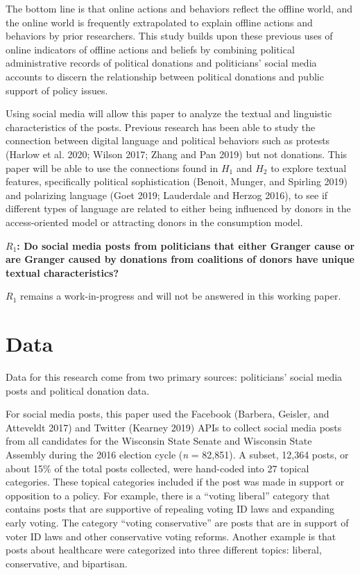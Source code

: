 \documentclass[12pt,]{article}
\begin{document}
The bottom line is that online actions and behaviors reflect the offline
world, and the online world is frequently extrapolated to explain
offline actions and behaviors by prior researchers. This study builds
upon these previous uses of online indicators of offline actions and
beliefs by combining political administrative records of political
donations and politicians' social media accounts to discern the
relationship between political donations and public support of policy
issues.

Using social media will allow this paper to analyze the textual and
linguistic characteristics of the posts. Previous research has been able
to study the connection between digital language and political behaviors
such as protests (Harlow et al. 2020; Wilson 2017; Zhang and Pan 2019)
but not donations. This paper will be able to use the connections found
in \(H_{1}\) and \(H_{2}\) to explore textual features, specifically
political sophistication (Benoit, Munger, and Spirling 2019) and
polarizing language (Goet 2019; Lauderdale and Herzog 2016), to see if
different types of language are related to either being influenced by
donors in the access-oriented model or attracting donors in the
consumption model.

\textbf{\(R_{1}\): Do social media posts from politicians that either
Granger cause or are Granger caused by donations from coalitions of
donors have unique textual characteristics?}

\(R_{1}\) remains a work-in-progress and will not be answered in this
working paper.

\hypertarget{data}{%
\section{Data}\label{data}}

Data for this research come from two primary sources: politicians'
social media posts and political donation data.

For social media posts, this paper used the Facebook (Barbera, Geisler,
and Atteveldt 2017) and Twitter (Kearney 2019) APIs to collect social
media posts from all candidates for the Wisconsin State Senate and
Wisconsin State Assembly during the 2016 election cycle (\emph{n} =
82,851). A subset, 12,364 posts, or about 15\% of the total posts
collected, were hand-coded into 27 topical categories. These topical
categories included if the post was made in support or opposition to a
policy. For example, there is a ``voting liberal'' category that
contains posts that are supportive of repealing voting ID laws and
expanding early voting. The category ``voting conservative'' are posts
that are in support of voter ID laws and other conservative voting
reforms. Another example is that posts about healthcare were categorized
into three different topics: liberal, conservative, and bipartisan.
\end{document}
